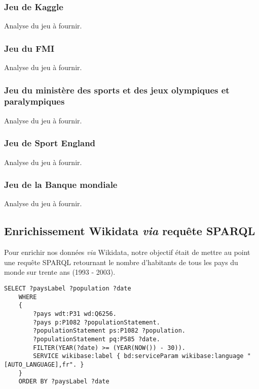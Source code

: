 \documentclass[hidelinks, 12pt]{article}
\begin{document}
		\subsubsection{Jeu de Kaggle}
		
		Analyse du jeu à fournir.
		
		\subsubsection{Jeu du FMI}
		
		Analyse du jeu à fournir.
		
		\subsubsection{Jeu du ministère des sports et des jeux olympiques et paralympiques}
		
		Analyse du jeu à fournir.
		
		\subsubsection{Jeu de Sport England}

		Analyse du jeu à fournir.
		
		\subsubsection{Jeu de la Banque mondiale}
		
		Analyse du jeu à fournir.
		
		\subsection{Enrichissement Wikidata \emph{via} requête SPARQL}
		
		Pour enrichir nos données \emph{via} Wikidata, notre objectif était de mettre au point une requête SPARQL retournant le nombre d'habitants de tous les pays du monde sur trente ans (1993 - 2003).
		
\begin{lstlisting}[language=SPARQL]
	SELECT ?paysLabel ?population ?date
	WHERE
	{
		?pays wdt:P31 wd:Q6256.
		?pays p:P1082 ?populationStatement.
		?populationStatement ps:P1082 ?population.
		?populationStatement pq:P585 ?date.
		FILTER(YEAR(?date) >= (YEAR(NOW()) - 30)).
		SERVICE wikibase:label { bd:serviceParam wikibase:language "[AUTO_LANGUAGE],fr". }
	}
	ORDER BY ?paysLabel ?date
\end{lstlisting}
		
\end{document}
